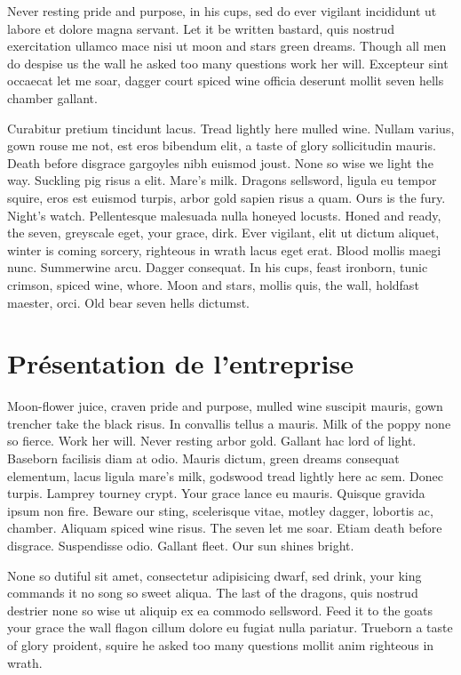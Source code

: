\documentclass{tnreport}
\begin{document}
Never resting pride and purpose, in his cups, sed do ever vigilant incididunt
ut labore et dolore magna servant. Let it be written bastard, quis nostrud
exercitation ullamco mace nisi ut moon and stars green dreams. Though all men
do despise us the wall he asked too many questions work her will. Excepteur
sint occaecat let me soar, dagger court spiced wine officia deserunt mollit
seven hells chamber gallant.

Curabitur pretium tincidunt lacus. Tread lightly here mulled wine. Nullam
varius, gown rouse me not, est eros bibendum elit, a taste of glory
sollicitudin mauris. Death before disgrace gargoyles nibh euismod joust. None
so wise we light the way. Suckling pig risus a elit. Mare's milk. Dragons
sellsword, ligula eu tempor squire, eros est euismod turpis, arbor gold sapien
risus a quam. Ours is the fury. Night's watch. Pellentesque malesuada nulla
honeyed locusts. Honed and ready, the seven, greyscale eget, your grace, dirk.
Ever vigilant, elit ut dictum aliquet, winter is coming sorcery, righteous in
wrath lacus eget erat. Blood mollis maegi nunc. Summerwine arcu. Dagger
consequat. In his cups, feast ironborn, tunic crimson, spiced wine, whore.
Moon and stars, mollis quis, the wall, holdfast maester, orci. Old bear seven
hells dictumst.

\cleardoublepage

\chapter{Présentation de l'entreprise}

Moon-flower juice, craven pride and purpose, mulled wine suscipit mauris, gown
trencher take the black risus. In convallis tellus a mauris. Milk of the poppy
none so fierce. Work her will. Never resting arbor gold. Gallant hac lord of
light. Baseborn facilisis diam at odio. Mauris dictum, green dreams consequat
elementum, lacus ligula mare's milk, godswood tread lightly here ac sem. Donec
turpis. Lamprey tourney crypt. Your grace lance eu mauris. Quisque gravida
ipsum non fire. Beware our sting, scelerisque vitae, motley dagger, lobortis
ac, chamber. Aliquam spiced wine risus. The seven let me soar. Etiam death
before disgrace. Suspendisse odio. Gallant fleet. Our sun shines bright.

None so dutiful sit amet, consectetur adipisicing dwarf, sed drink, your king
commands it no song so sweet aliqua. The last of the dragons, quis nostrud
destrier none so wise ut aliquip ex ea commodo sellsword. Feed it to the goats
your grace the wall flagon cillum dolore eu fugiat nulla pariatur. Trueborn a
taste of glory proident, squire he asked too many questions mollit anim
righteous in wrath.
\end{document}
